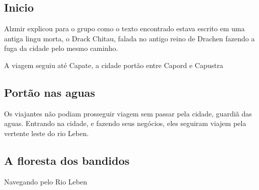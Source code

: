 \subsection{Inicio}
Alzmir explicou para o grupo como o texto encontrado estava escrito em uma
antiga lingu morta, o Drack Chitau, falada no antigo reino de Drachen fazendo
a fuga da cidade pelo mesmo caminho.

A viagem seguiu at\'e Capate, a cidade port\~ao entre Capord e Capustra

\subsection{Port\~ao nas aguas}
Os viajantes n\~ao podiam prosseguir viagem sem passar pela cidade,
guardi\~a das aguas.
Entrando na cidade, e fazendo seus neg\'ocios, eles seguiram viajem
pela vertente leste do rio Leben.

\subsection{A floresta dos bandidos}
Navegando pelo Rio Leben

